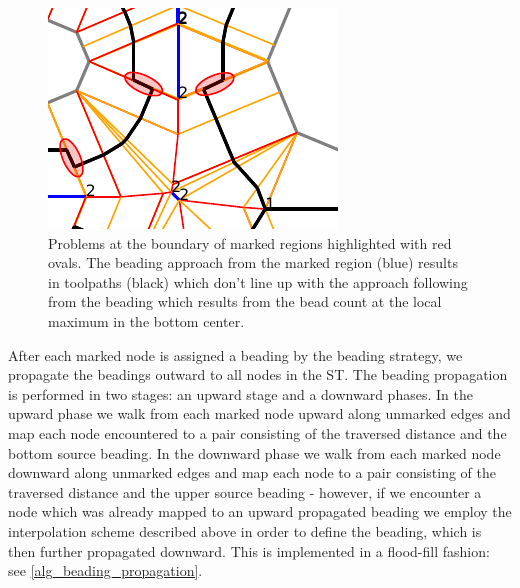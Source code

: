 \begin{figure}
\centering
\includegraphics[width=.5\columnwidth]{sources/method/transition_to_insignificance_problem.pdf}
\caption{
Problems at the boundary of marked regions highlighted with red ovals.
The beading approach from the marked region (blue) results in toolpaths (black) which don't line up with the approach following from the beading which results from the bead count at the local maximum in the bottom center.
}
\label{beading_conflict_problem}
\end{figure}

After each marked node is assigned a beading by the beading strategy, we propagate the beadings outward to all nodes in the ST.
The beading propagation is performed in two stages: an upward stage and a downward phases.
In the upward phase we walk from each marked node upward along unmarked edges and map each node encountered to a pair consisting of the traversed distance and the bottom source beading.
In the downward phase we walk from each marked node downward along unmarked edges and map each node to a pair consisting of the traversed distance and the upper source beading -
however, if we encounter a node which was already mapped to an upward propagated beading we employ the interpolation scheme described above in order to define the beading, which is then further propagated downward.
This is implemented in a flood-fill fashion: see \cref{alg_beading_propagation}.

